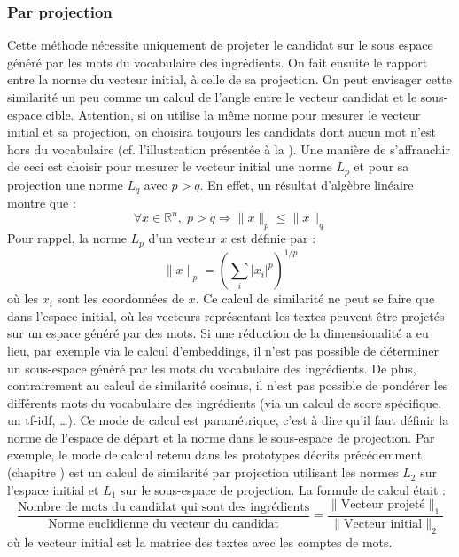             \subsubsection{Par projection}
            \label{similarite_projection}

            Cette méthode nécessite uniquement de projeter le candidat sur le sous espace généré par les mots du vocabulaire des ingrédients.
            On fait ensuite le rapport entre la norme du vecteur initial, à celle de sa projection. 
            On peut envisager cette similarité un peu comme un calcul de l'angle entre le vecteur candidat et le sous-espace cible.
            Attention, si on utilise la même norme pour mesurer le vecteur initial et sa projection, on choisira toujours les candidats dont aucun mot n'est hors du vocabulaire (cf. l'illustration présentée à la ).
            Une manière de s'affranchir de ceci est choisir pour mesurer le vecteur initial une norme $L_{p}$ et pour sa projection une norme $L_{q}$ avec $p > q$.
            En effet, un résultat d'algèbre linéaire~\cite{lpnorms} montre que :
            \[\forall x \in \mathbb{R}^{n}, \; p > q \Rightarrow \lVert x \rVert_{p} \leqslant \lVert x \rVert_{q}\]
            Pour rappel, la norme $L_{p}$ d'un vecteur $x$ est définie par : 
            \[\lVert x \rVert_{p} = \left( \sum_{i} |x_{i}|^{p} \right)^{1/p} \]
            où les $x_{i}$ sont les coordonnées de $x$.
            Ce calcul de similarité ne peut se faire que dans l'espace initial, où les vecteurs représentant les textes peuvent être projetés sur un espace généré par des mots.
            Si une réduction de la dimensionalité a eu lieu, par exemple via le calcul d'embeddings, il n'est pas possible de déterminer un sous-espace généré par les mots du vocabulaire des ingrédients.
            De plus, contrairement au calcul de similarité cosinus, il n'est pas possible de pondérer les différents mots du vocabulaire des ingrédients (via un calcul de score spécifique, un tf-idf, \dots).
            Ce mode de calcul est paramétrique, c'est à dire qu'il faut définir la norme de l'espace de départ et la norme dans le sous-espace de projection.
            Par exemple, le mode de calcul retenu dans les prototypes décrits précédemment (chapitre ) est un calcul de similarité par projection utilisant les normes $L_{2}$ sur l'espace initial et $L_{1}$ sur le sous-espace de projection.
            La formule de calcul était : 
            \[\frac{\text{Nombre de mots du candidat qui sont des ingrédients}}{\text{Norme euclidienne du vecteur du candidat}} = \frac{\lVert\text{Vecteur projeté}\rVert_{1}}{\lVert\text{Vecteur initial}\rVert_{2}}\]
            où le vecteur initial est la matrice des textes avec les comptes de mots.

